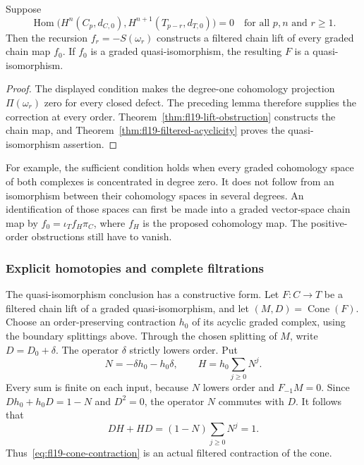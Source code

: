 \begin{corollary}\label{cor:fl19-explicit-lift}
Suppose
\[
\operatorname{Hom}\bigl(H^n(C_p,d_{C,0}),
H^{n+1}(T_{p-r},d_{T,0})\bigr)=0
\quad\text{for all }p,n\text{ and }r\ge1.
\]
Then the recursion $f_r=-S(\omega_r)$ constructs a filtered chain lift of every graded chain map $f_0$.
If $f_0$ is a graded quasi-isomorphism, the resulting $F$ is a quasi-isomorphism.
\end{corollary}
\begin{proof}
The displayed condition makes the degree-one cohomology projection $\Pi(\omega_r)$ zero for every closed defect.
The preceding lemma therefore supplies the correction at every order.
Theorem~\ref{thm:fl19-lift-obstruction} constructs the chain map, and
Theorem~\ref{thm:fl19-filtered-acyclicity} proves the quasi-isomorphism assertion.
\end{proof}

For example, the sufficient condition holds when every graded cohomology space of both complexes is concentrated in degree zero.
It does not follow from an isomorphism between their cohomology spaces in several degrees.
An identification of those spaces can first be made into a graded vector-space chain map by
$f_0=\iota_T f_H\pi_C$, where $f_H$ is the proposed cohomology map.
The positive-order obstructions still have to vanish.

\subsubsection{Explicit homotopies and complete filtrations}

The quasi-isomorphism conclusion has a constructive form.
Let $F:C\to T$ be a filtered chain lift of a graded quasi-isomorphism, and let $(M,D)=\operatorname{Cone}(F)$.
Choose an order-preserving contraction $h_0$ of its acyclic graded complex, using the boundary splittings above.
Through the chosen splitting of $M$, write $D=D_0+\delta$.
The operator $\delta$ strictly lowers order.
Put
\begin{equation}\label{eq:fl19-cone-contraction}
N=-\delta h_0-h_0\delta,
\qquad H=h_0\sum_{j\ge0}N^j.
\end{equation}
Every sum is finite on each input, because $N$ lowers order and $F_{-1}M=0$.
Since $Dh_0+h_0D=1-N$ and $D^2=0$, the operator $N$ commutes with $D$.
It follows that
\[
DH+HD=(1-N)\sum_{j\ge0}N^j=1.
\]
Thus~\eqref{eq:fl19-cone-contraction} is an actual filtered contraction of the cone.

